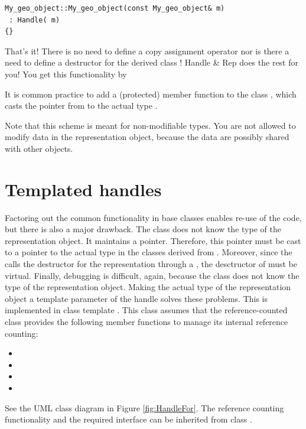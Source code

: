 \begin{verbatim}
My_geo_object::My_geo_object(const My_geo_object& m)
 : Handle( m) 
{}
\end{verbatim}

That's it!
There is no need to define a copy assignment operator nor is there a 
need to define a destructor for the derived class !  
Handle \& Rep does the rest for you!
You get this functionality by


It is common practice to add a (protected) member function 
to the class ,
which casts the  pointer from  to the actual type
. 

Note that this scheme is meant for non-modifiable types. You are not allowed
to modify data in the representation object, because the data are possibly
shared with other  objects.

\section{Templated handles}
Factoring out the common functionality in base classes enables re-use of 
the code, but there is also a major drawback. The  class does not
know the type of the representation object. It maintains a  pointer.
Therefore, this pointer must be cast to a pointer to the actual type
in the classes derived from . Moreover, since the 
calls the destructor for the representation through a , the
desctructor of  must be virtual. Finally, debugging is difficult,
again, because the  class does not know the type of the 
representation object.
Making the actual type of the representation object a template parameter
of the handle solves these problems. This is implemented in class template
.%
This class assumes that the reference-counted class provides the
following member functions
to manage its internal reference counting: 
\def\ccIndexClassName{Ref_counted}
\begin{itemize}
\item{}
\item{}
\item{}
\item{}
\end{itemize}
See the UML class diagram in Figure \ref{fig:HandleFor}.
The reference counting functionality and the required
interface can be inherited from class .

